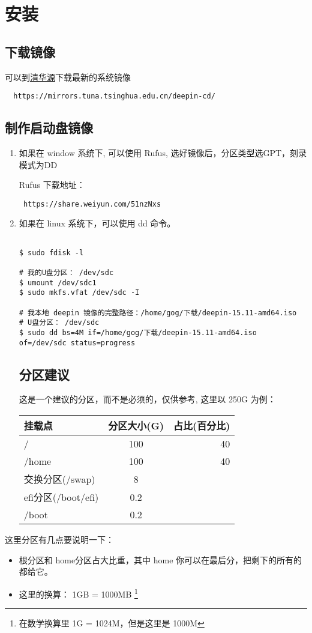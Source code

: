 \setcounter{page}{1} %
\chapter{安装}
\section{下载镜像}
可以到\href{https://mirrors.tuna.tsinghua.edu.cn/deepin-cd/}{清华源}下载最新的系统镜像

\begin{verbatim}
  https://mirrors.tuna.tsinghua.edu.cn/deepin-cd/
\end{verbatim}
  
\section{制作启动盘镜像}
\flushleft
\begin{enumerate}
\item 如果在 window 系统下, 可以使用 Rufus, 选好镜像后，分区类型选GPT，刻录模式为DD

Rufus 下载地址：\\
\begin{lstlisting}
 https://share.weiyun.com/51nzNxs
\end{lstlisting}
\item 如果在 linux 系统下，可以使用 dd 命令。
\begin{lstlisting}

$ sudo fdisk -l 

# 我的U盘分区： /dev/sdc
$ umount /dev/sdc1
$ sudo mkfs.vfat /dev/sdc -I

# 我本地 deepin 镜像的完整路径：/home/gog/下载/deepin-15.11-amd64.iso 
# U盘分区： /dev/sdc
$ sudo dd bs=4M if=/home/gog/下载/deepin-15.11-amd64.iso of=/dev/sdc status=progress
\end{lstlisting}

\section{分区建议}
这是一个建议的分区，而不是必须的，仅供参考, 这里以 250G 为例：


\begin{tabular}{|l|c|r|}
\hline
 挂载点 & 分区大小(G) & 占比(百分比)\\
\hline
   / & 100 & 40 \\      
\hline
   /home & 100 & 40 \\      
\hline
  交换分区(/swap) & 8 & \\
\hline
  efi分区(/boot/efi) & 0.2 & \\
\hline
  /boot & 0.2 & \\
\hline

\end{tabular}
\end{enumerate}


\setlength\parindent{2em}这里分区有几点要说明一下：

\begin{itemize}
\item 根分区和 home分区占大比重，其中 home 你可以在最后分，把剩下的所有的都给它。
\item 这里的换算： 1GB = 1000MB \footnote{在数学换算里 1G = 1024M，但是这里是 1000M}
\end{itemize}